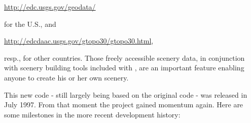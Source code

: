  \href{http://edc.usgs.gov/geodata/}{http://edc.usgs.gov/geodata/}
 \medskip

\noindent
 for the U.S., and
  \medskip

 \href{http://edcdaac.usgs.gov/gtopo30/gtopo30.html}{http://edcdaac.usgs.gov/gtopo30/gtopo30.html},
  \medskip

\noindent
 resp., for other countries. Those freely accessible scenery data, in
 conjunction with scenery building tools included with
 \FlightGear{}$\!$, are an important feature enabling anyone to
  create his or her own scenery.

This new \FlightGear{} code - still largely being based on the original 
code - was released in July 1997. From that moment the project gained momentum again.
Here are some milestones in the more recent development history:

